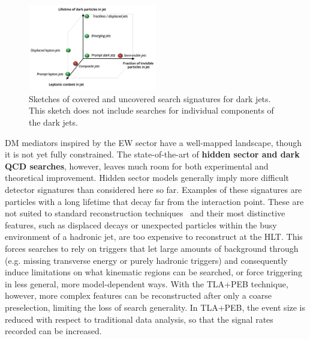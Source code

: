 \begin{figure} 
\begin{center}
\includegraphics[width=0.5\textwidth]{figs_B2/DarkSectorSketch}
\caption{Sketches of covered and uncovered search signatures for dark jets. This sketch does not include searches for individual components of the dark jets. \label{fig:darksectorssketch} }
\vskip-10pt
\end{center}
\end{figure}
 
DM mediators inspired by the EW sector have a well-mapped landscape, though it is not yet fully constrained.
The state-of-the-art of \textbf{hidden sector and dark QCD searches}, however, leaves much room for both experimental and theoretical improvement.
Hidden sector models generally imply more difficult detector signatures than considered here so far. 
Examples of these signatures are particles with a long lifetime that decay far from the interaction point.
These are not suited to standard reconstruction techniques~\cite{Lee:2018pag} and their most distinctive features, such as displaced decays or unexpected particles within the busy environment of a hadronic jet, are too expensive to reconstruct at the HLT. %
This forces searches to rely on triggers that let large amounts of background through (e.g. missing transverse energy or purely hadronic triggers) and consequently induce limitations on what kinematic regions can be searched, or force triggering in less general, more model-dependent ways. 
With the TLA+PEB technique, however, more complex features can be reconstructed after only a coarse preselection, limiting the loss of search generality. In TLA+PEB, the event size is reduced with respect to traditional data analysis, so that the signal rates recorded can be increased. 


